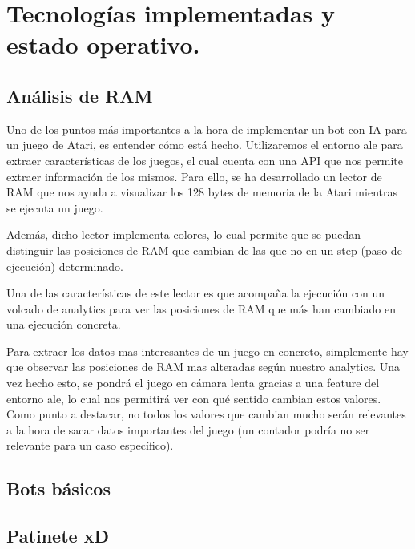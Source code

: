 \section{Tecnologías implementadas y estado operativo.}
\subsection{Análisis de RAM}

Uno de los puntos más importantes a la hora de implementar un bot con IA para un juego de Atari, es entender cómo está hecho. Utilizaremos el entorno \ac{ale} para extraer características de los juegos, el cual cuenta con una API que nos permite extraer información de los mismos. Para ello, se ha desarrollado un lector de RAM que nos ayuda a visualizar los 128 bytes de memoria de la Atari mientras se ejecuta un juego.

Además, dicho lector implementa colores, lo cual permite que se puedan distinguir las posiciones de RAM que cambian de las que no en un step (paso de ejecución) determinado.


Una de las características de este lector es que acompaña la ejecución con un volcado de analytics para ver las posiciones de RAM que más han cambiado en una ejecución concreta.


Para extraer los datos mas interesantes de un juego en concreto, simplemente hay que observar las posiciones de RAM mas alteradas según nuestro analytics. Una vez hecho esto, se pondrá el juego en cámara lenta gracias a una feature del entorno \ac{ale}, lo cual nos permitirá ver con qué sentido cambian estos valores. Como punto a destacar, no todos los valores que cambian mucho serán relevantes a la hora de sacar datos importantes del juego (un contador podría no ser relevante para un caso específico).

\subsection{Bots básicos}


\subsection{Patinete xD}


\newpage